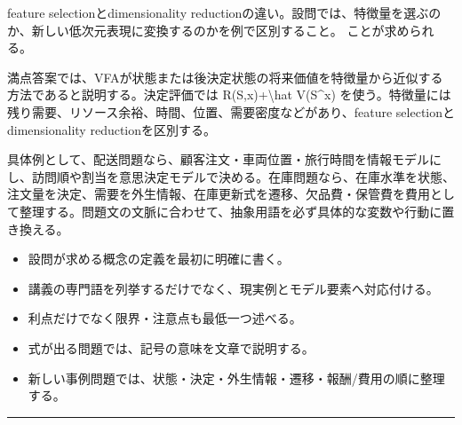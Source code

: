 \clearpage{}
feature selectionとdimensionality reductionの違い。設問では、特徴量を選ぶのか、新しい低次元表現に変換するのかを例で区別すること。 ことが求められる。\par
{}
満点答案では、VFAが状態または後決定状態の将来価値を特徴量から近似する方法であると説明する。決定評価では R(S,x)+\textbackslash{}hat V(S\textasciicircum{}x) を使う。特徴量には残り需要、リソース余裕、時間、位置、需要密度などがあり、feature selectionとdimensionality reductionを区別する。\par
{}
具体例として、配送問題なら、顧客注文・車両位置・旅行時間を情報モデルにし、訪問順や割当を意思決定モデルで決める。在庫問題なら、在庫水準を状態、注文量を決定、需要を外生情報、在庫更新式を遷移、欠品費・保管費を費用として整理する。問題文の文脈に合わせて、抽象用語を必ず具体的な変数や行動に置き換える。\par
{}
\begin{itemize}
\item 設問が求める概念の定義を最初に明確に書く。
\item 講義の専門語を列挙するだけでなく、現実例とモデル要素へ対応付ける。
\item 利点だけでなく限界・注意点も最低一つ述べる。
\item 式が出る問題では、記号の意味を文章で説明する。
\item 新しい事例問題では、状態・決定・外生情報・遷移・報酬/費用の順に整理する。
\end{itemize}
\vspace{2mm}\hrule\vspace{2mm}